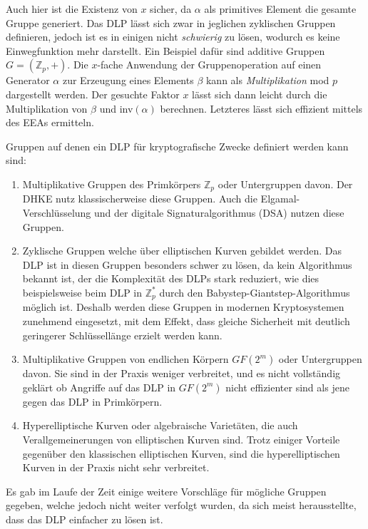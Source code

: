 Auch hier ist die Existenz von $x$ sicher, da $\alpha$ als primitives Element die gesamte Gruppe generiert. Das DLP lässt sich zwar in jeglichen zyklischen Gruppen definieren, jedoch ist es in einigen nicht \textit{schwierig} zu lösen, wodurch es keine Einwegfunktion mehr darstellt. Ein Beispiel dafür sind additive Gruppen $G = (\mathbb{Z}_p, +)$. Die $x$-fache Anwendung der Gruppenoperation auf einen Generator $\alpha$ zur Erzeugung eines Elements $\beta$ kann als \textit{Multiplikation} mod $p$ dargestellt werden. Der gesuchte Faktor $x$ lässt sich dann leicht durch die Multiplikation von $\beta$ und inv$(\alpha)$ berechnen. Letzteres lässt sich effizient mittels des EEAs ermitteln.

Gruppen auf denen ein DLP für kryptografische Zwecke definiert werden kann sind:
\begin{enumerate}
\item Multiplikative Gruppen des Primkörpers $\mathbb{Z}_p$ oder Untergruppen davon. Der DHKE nutz klassischerweise diese Gruppen. Auch die Elgamal-Verschlüsselung und der digitale Signaturalgorithmus (DSA) nutzen diese Gruppen.

\item Zyklische Gruppen welche über elliptischen Kurven gebildet werden. Das DLP ist in diesen Gruppen besonders schwer zu lösen, da kein Algorithmus bekannt ist, der die Komplexität des DLPs stark reduziert, wie dies beispielsweise beim DLP in $\mathbb{Z}^*_p$ durch den Babystep-Giantstep-Algorithmus möglich ist. Deshalb werden diese Gruppen in modernen Kryptosystemen zunehmend eingesetzt, mit dem Effekt, dass gleiche Sicherheit mit deutlich geringerer Schlüssellänge erzielt werden kann.

\item Multiplikative Gruppen von endlichen Körpern $GF(2^m)$ oder Untergruppen davon. Sie sind in der Praxis weniger verbreitet, und es nicht vollständig geklärt ob Angriffe auf das DLP in $GF(2^m)$ nicht effizienter sind als jene gegen das DLP in Primkörpern.

\item Hyperelliptische Kurven oder algebraische Varietäten, die auch Verallgemeinerungen von elliptischen Kurven sind. Trotz einiger Vorteile gegenüber den klassischen elliptischen Kurven, sind die hyperelliptischen Kurven in der Praxis nicht sehr verbreitet.
\end{enumerate}

Es gab im Laufe der Zeit einige weitere Vorschläge für mögliche Gruppen gegeben, welche jedoch nicht weiter verfolgt wurden, da sich meist herausstellte, dass das DLP einfacher zu lösen ist.\cite{Paar.2016}

